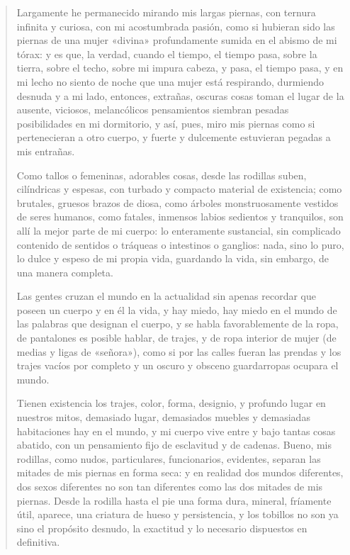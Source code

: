 \documentclass[12pt]{article}
\begin{document}
\clearpage
{}
\begin{verse}
Largamente he permanecido mirando mis largas piernas,  
con ternura infinita y curiosa, con mi acostumbrada pasión,  
como si hubieran sido las piernas de una mujer «divina»  
profundamente sumida en el abismo de mi tórax:  
y es que, la verdad, cuando el tiempo, el tiempo pasa,  
sobre la tierra, sobre el techo, sobre mi impura cabeza,  
y pasa, el tiempo pasa, y en mi lecho no siento de noche que una  
mujer está respirando, durmiendo desnuda y a mi lado,  
entonces, extrañas, oscuras cosas toman el lugar de la ausente,  
viciosos, melancólicos pensamientos  
siembran pesadas posibilidades en mi dormitorio,  
y así, pues, miro mis piernas como si pertenecieran a otro cuerpo,  
y fuerte y dulcemente estuvieran pegadas a mis entrañas.  
  
Como tallos o femeninas, adorables cosas,  
desde las rodillas suben, cilíndricas y espesas,  
con turbado y compacto material de existencia;  
como brutales, gruesos brazos de diosa,  
como árboles monstruosamente vestidos de seres humanos,  
como fatales, inmensos labios sedientos y tranquilos,  
son allí la mejor parte de mi cuerpo:  
lo enteramente sustancial, sin complicado contenido  
de sentidos o tráqueas o intestinos o ganglios:  
nada, sino lo puro, lo dulce y espeso de mi propia vida,  
guardando la vida, sin embargo, de una manera completa.  
  
Las gentes cruzan el mundo en la actualidad  
sin apenas recordar que poseen un cuerpo y en él la vida,  
y hay miedo, hay miedo en el mundo de las palabras que designan el cuerpo,  
y se habla favorablemente de la ropa,  
de pantalones es posible hablar, de trajes,  
y de ropa interior de mujer (de medias y ligas de «señora»),  
como si por las calles fueran las prendas y los trajes vacíos por completo  
y un oscuro y obsceno guardarropas ocupara el mundo.  
  
Tienen existencia los trajes, color, forma, designio,  
y profundo lugar en nuestros mitos, demasiado lugar,  
demasiados muebles y demasiadas habitaciones hay en el mundo,  
y mi cuerpo vive entre y bajo tantas cosas abatido,  
con un pensamiento fijo de esclavitud y de cadenas.  
Bueno, mis rodillas, como nudos,  
particulares, funcionarios, evidentes,  
separan las mitades de mis piernas en forma seca:  
y en realidad dos mundos diferentes, dos sexos diferentes  
no son tan diferentes como las dos mitades de mis piernas.  
Desde la rodilla hasta el pie una forma dura,  
mineral, fríamente útil, aparece,  
una criatura de hueso y persistencia,  
y los tobillos no son ya sino el propósito desnudo,  
la exactitud y lo necesario dispuestos en definitiva.  
  

\end{verse}
\end{document}
